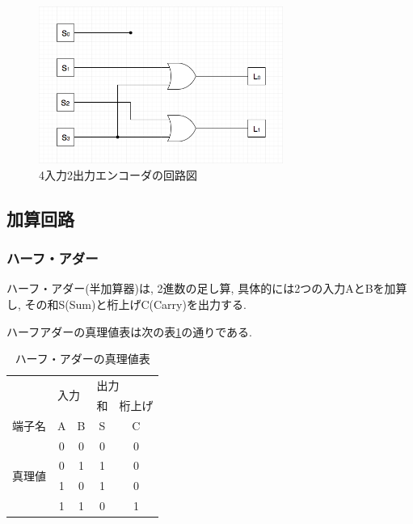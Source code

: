 \documentclass[a4paper, 11pt, uplatex]{jsarticle}
\begin{document}
\begin{figure}[H]
  \begin{center}
    \includegraphics[width = 8cm]{画像/エンコーダ.png}
    \caption{4入力2出力エンコーダの回路図}
    \label{エンコーダ}
  \end{center}
\end{figure}

\subsection{加算回路}
\subsubsection{ハーフ・アダー}
ハーフ・アダー(半加算器)は,  2進数の足し算,  具体的には2つの入力AとBを加算し,  その和S(Sum)と桁上げC(Carry)を出力する.

ハーフアダーの真理値表は次の表\ref{ハーフアダー真理値表}の通りである.
\begin{table}[H]
  \begin{center}
  \caption{ハーフ・アダーの真理値表}
  \label{ハーフアダー真理値表}
\begin{tabular}{|c|c|c|c|c|}
  \hline
                      & \multicolumn{2}{l|}{\multirow{2}{*}{入力}} & \multicolumn{2}{l|}{出力} \\ \cline{4-5}
                      & \multicolumn{2}{l|}{}                    & 和          & 桁上げ        \\ \hline
  端子名                 & A                   & B                  & S          & C          \\ \hline \hline
  \multirow{4}{*}{真理値} & 0                   & 0                  & 0          & 0          \\
                      & 0                   & 1                  & 1          & 0          \\
                      & 1                   & 0                  & 1          & 0          \\
                      & 1                   & 1                  & 0          & 1          \\ \hline
\end{tabular}
\end{center}
\end{table}
\end{document}
